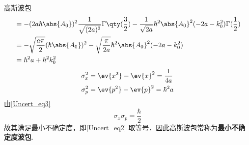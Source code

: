 \begin{example}{高斯波包}
\begin{equation}
\begin{aligned}
&=-(2a\hbar\abs{A_0})^2\frac{1}{\sqrt{(2a)^3}}\Gamma\qty(\frac{3}{2})-\frac{1}{\sqrt{2a}}\hbar^2 \abs{A_0}^2(-2a-k_0^2)\Gamma(\frac{1}{2})\\
&=-\sqrt{\frac{a\pi}{2}}(\hbar\abs{A_0})^2-\sqrt{\frac{\pi}{2a}}\hbar^2 \abs{A_0}^2(-2a-k_0^2)\\
&=\hbar^2a+\hbar^2k_0^2
\end{aligned}
\end{equation}
\begin{equation}\label{Uncert_eq3}
\begin{aligned}
\sigma_x^2&=\ev{x^2}-\ev{x}^2=\frac{1}{4a} \\
\sigma_p^2&=\ev{p^2}-\ev{p}^2=\hbar^2a
\end{aligned}
\end{equation}
由\autoref{Uncert_eq3} 
\begin{equation}
\sigma_x\sigma_p=\frac{\hbar}{2}
\end{equation}
故其满足最小不确定度，即\autoref{Uncert_eq2} 取等号．因此高斯波包常称为\textbf{最小不确定度波包}.
\end{example}














